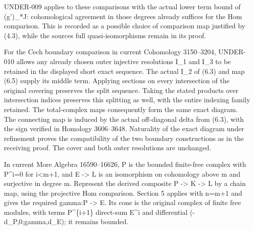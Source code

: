 \documentclass[11pt]{article}
\begin{document}
UNDER-009 applies to these comparisons with the actual lower term bound of (g')\allowbreak{}\_\allowbreak{}*J:\allowbreak{} cohomological agreement in those degrees already suffices for the Hom comparison. This is recorded as a possible choice of comparison map justified by (4.3)\allowbreak{},\allowbreak{} while the source\textquotesingle s full quasi-isomorphisms remain in its proof.

For the Cech boundary comparison in current Cohomology 3150–\allowbreak{}3204,\allowbreak{} UNDER-010 allows any already chosen outer injective resolutions I\_\allowbreak{}1 and I\_\allowbreak{}3 to be retained in the displayed short exact sequence. The actual I\_\allowbreak{}2 of (6.3)\allowbreak{} and map (6.5)\allowbreak{} supply its middle term. Applying sections on every intersection of the original covering preserves the split sequence. Taking the stated products over intersection indices preserves this splitting as well,\allowbreak{} with the entire indexing family retained. The total-complex maps consequently form the same exact diagram. The connecting map is induced by the actual off-diagonal delta\textquotesingle{} from (6.3)\allowbreak{},\allowbreak{} with the sign verified in Homology 3606–\allowbreak{}3648. Naturality of the exact diagram under refinement proves the compatibility of the two boundary constructions as in the receiving proof. The cover and both outer resolutions are unchanged.

In current More Algebra 16590–\allowbreak{}16626,\allowbreak{} P is the bounded finite-free complex with P\textasciicircum{}i\allowbreak{}=0 for i<m\allowbreak{}+1,\allowbreak{} and E \allowbreak{}-> L is an isomorphism on cohomology above m and surjective in degree m. Represent the derived composite P \allowbreak{}-> K \allowbreak{}-> L by a chain map,\allowbreak{} using the projective Hom comparison. Section 5 applies with n\allowbreak{}=m\allowbreak{}+1 and gives the required gamma:\allowbreak{}P \allowbreak{}-> E. Its cone is the original complex of finite free modules,\allowbreak{} with terms P\textasciicircum{}\{i\allowbreak{}+1\} direct-sum E\^{}i and differential (-d\_\allowbreak{}P,\allowbreak{}0;gamma,\allowbreak{}d\_\allowbreak{}E)\allowbreak{}; it remains bounded.
\end{document}
